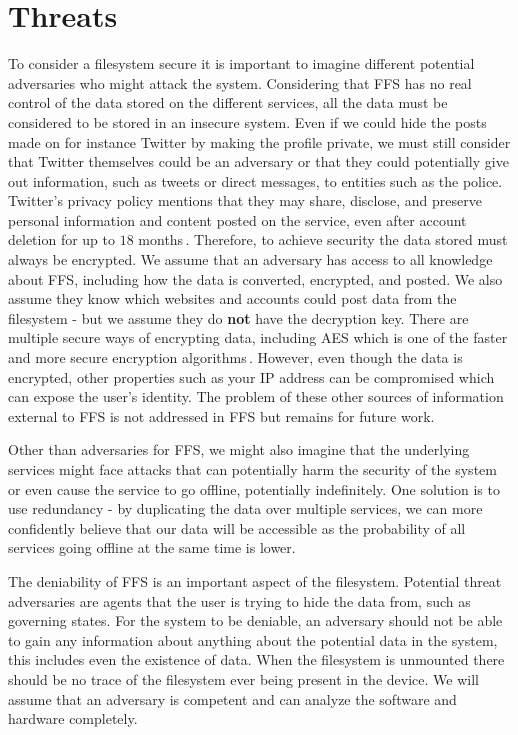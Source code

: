 \section{Threats}
To consider a filesystem secure it is important to imagine different potential adversaries who might attack the system. Considering that FFS has no real control of the data stored on the different services, all the data must be considered to be stored in an insecure system. Even if we could hide the posts made on for instance Twitter by making the profile private, we must still consider that Twitter themselves could be an adversary or that they could potentially give out information, such as tweets or direct messages, to entities such as the police. Twitter's privacy policy mentions that they may share, disclose, and preserve personal information and content posted on the service, even after account deletion for up to $18$ months\,\cite{TwitterPrivacyPolicy}. Therefore, to achieve security the data stored must always be encrypted. We assume that an adversary has access to all knowledge about FFS, including how the data is converted, encrypted, and posted. We also assume they know which websites and accounts could post data from the filesystem - but we assume they do \textbf{not} have the decryption key. There are multiple secure ways of encrypting data, including AES which is one of the faster and more secure encryption algorithms\,\cite{mahajanStudyEncryptionAlgorithms2013}. However, even though the data is encrypted, other properties such as your IP address can be compromised which can expose the user's identity. The problem of these other sources of information external to FFS is not addressed in FFS but remains for future work.

Other than adversaries for FFS, we might also imagine that the underlying services might face attacks that can potentially harm the security of the system or even cause the service to go offline, potentially indefinitely. One solution is to use redundancy - by duplicating the data over multiple services, we can more confidently believe that our data will be accessible as the probability of all services going offline at the same time is lower.

The deniability of FFS is an important aspect of the filesystem. Potential threat adversaries are agents that the user is trying to hide the data from, such as governing states. For the system to be deniable, an adversary should not be able to gain any information about anything about the potential data in the system, this includes even the existence of data. When the filesystem is unmounted there should be no trace of the filesystem ever being present in the device. We will assume that an adversary is competent and can analyze the software and hardware completely.
